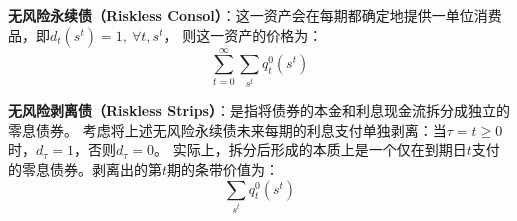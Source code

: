 \begin{example}
    \textbf{无风险永续债（Riskless Consol）}：这一资产会在每期都确定地提供一单位消费品，即$d_t\left(s^t\right)=1,~\forall t, s^t$，
    则这一资产的价格为：
    \begin{equation}    \label{eq-price-consol}
        \sum_{t=0}^{\infty} \sum_{s^t} q_t^0\left(s^t\right)
    \end{equation}
\end{example}

\begin{example}
    \textbf{无风险剥离债（Riskless Strips）}：是指将债券的本金和利息现金流拆分成独立的零息债券。
    考虑将上述无风险永续债未来每期的利息支付单独剥离：当$\tau=t\geq 0$时，$d_{\tau}=1$，否则$d_{\tau}=0$。
    实际上，拆分后形成的本质上是一个仅在到期日$t$支付的零息债券。剥离出的第$t$期的条带价值为：
    \begin{equation}    \label{eq-price-strip}
        \sum_{s^t}q_t^0\left(s^t\right)
    \end{equation}
\end{example}

